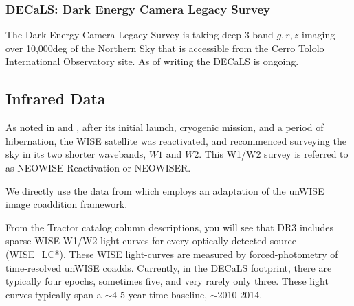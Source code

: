 \documentclass[apj]{emulateapj}
\begin{document}
    \subsubsection{DECaLS: Dark Energy Camera Legacy Survey}
    The Dark Energy Camera Legacy Survey \citep[DECaLS; ][]{Lang16} is
    taking deep 3-band $g,r,z$ imaging over 10,000deg of the Northern Sky
    that is accessible from the Cerro Tololo International Observatory
    site. As of writing the DECaLS is ongoing.
        
\subsection{Infrared Data}
As noted in \citet{Mainzer14} and \citet{Meisner16}, after its initial
launch, cryogenic mission, and a period of hibernation, the WISE
satellite was reactivated, and recommenced surveying the sky in its
two shorter wavebands, $W1$ and $W2$.  This W1/W2 survey is referred
to as NEOWISE-Reactivation or NEOWISER.
    
We directly use the data from \citet{Meisner16} which employs an
adaptation of the unWISE \citet{Lang14} image coaddition framework.
    
From the Tractor catalog column descriptions, you will
see that DR3 includes sparse WISE W1/W2 light curves for every
optically detected source (WISE\_LC*). These WISE light-curves are
measured by forced-photometry of time-resolved unWISE coadds.
Currently, in the DECaLS footprint, there are typically four epochs,
sometimes five, and very rarely only three. These light curves
typically span a $\sim$4-5 year time baseline, $\sim$2010-2014.
   
\end{document}
